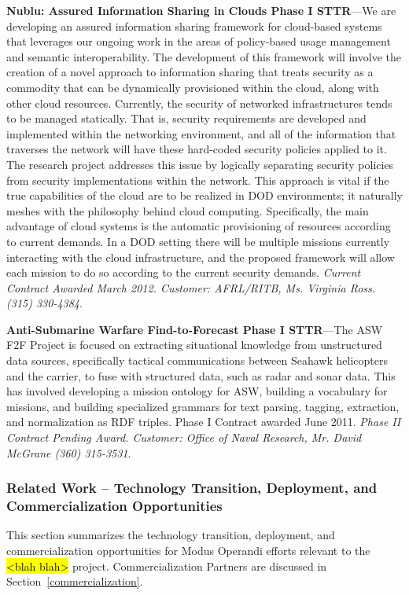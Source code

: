 \documentclass{sbir}
\begin{document}
{\bf Nublu: Assured Information Sharing in Clouds Phase I STTR}---We are developing an assured information sharing framework for cloud-based systems that leverages our ongoing work in the areas of policy-based usage management and semantic interoperability. The development of this framework will involve the creation of a novel approach to information sharing that treats security as a commodity that can be dynamically provisioned within the cloud, along with other cloud resources. Currently, the security of networked infrastructures tends to be managed statically. That is, security requirements are developed and implemented within the networking environment, and all of the information that traverses the network will have these hard-coded security policies applied to it. The research project addresses this issue by logically separating security policies from security implementations within the network. This approach is vital if the true capabilities of the cloud are to be realized in DOD environments; it naturally meshes with the philosophy behind cloud computing. Specifically, the main advantage of cloud systems is the automatic provisioning of resources according to current demands. In a DOD setting there will be multiple missions currently interacting with the cloud infrastructure, and the proposed framework will allow each mission to do so according to the current security demands. \emph{Current Contract Awarded March 2012. Customer: AFRL/RITB, Ms. Virginia Ross. (315) 330-4384}.

{\bf Anti-Submarine Warfare Find-to-Forecast Phase I STTR}---The ASW F2F Project is focused on extracting situational knowledge from unstructured data sources, specifically tactical communications between Seahawk helicopters and the carrier, to fuse with structured data, such as radar and sonar data. This has involved developing a mission ontology for ASW, building a vocabulary for missions, and building specialized grammars for text parsing, tagging, extraction, and normalization as RDF triples. Phase I Contract awarded June 2011. \emph{Phase II Contract Pending Award. Customer: Office of Naval Research, Mr. David McGrane (360) 315-3531}.

\subsubsection{Related Work -- Technology Transition, Deployment, and Commercialization Opportunities}
This section summarizes the technology transition, deployment, and commercialization opportunities for Modus Operandi efforts relevant to the \hl{<blah blah>} project. Commercialization Partners are discussed in Section~\ref{commercialization}.
\end{document}
